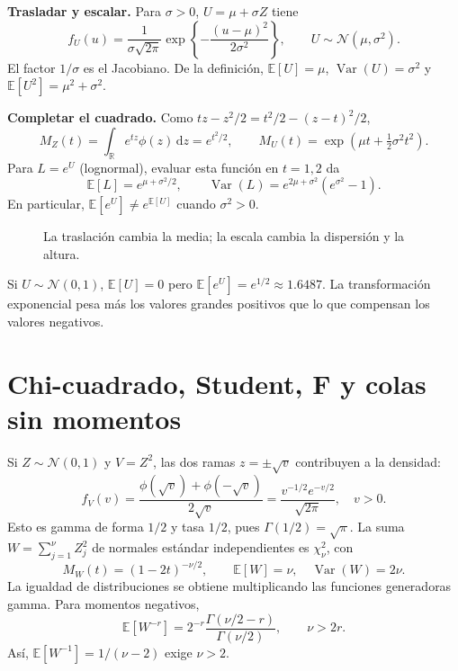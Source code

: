 \documentclass[11pt,a4paper]{article}
\newcommand{\R}{\mathbb R}
\newcommand{\E}{\mathbb E}
\newcommand{\dd}{\,\mathrm d}
\DeclareMathOperator{\Var}{Var}
\newcommand{\Normal}{\mathcal N}
\newcommand{\topic}[2]{\clearpage\section{#1}\label{#2}}
\theoremstyle{definition}\newtheorem{definicion}[teorema]{Definición}
\begin{document}
\textbf{Trasladar y escalar.} Para $\sigma>0$, $U=\mu+\sigma Z$ tiene
\[
f_U(u)=\frac1{\sigma\sqrt{2\pi}}
\exp\!\left\{-\frac{(u-\mu)^2}{2\sigma^2}\right\},
\qquad U\sim\Normal(\mu,\sigma^2).
\]
El factor $1/\sigma$ es el Jacobiano. De la definición,
$\E[U]=\mu$, $\Var(U)=\sigma^2$ y $\E[U^2]=\mu^2+\sigma^2$.

\textbf{Completar el cuadrado.} Como $tz-z^2/2=t^2/2-(z-t)^2/2$,
\[
M_Z(t)=\int_{\R}e^{tz}\phi(z)\dd z=e^{t^2/2},
\qquad
M_U(t)=\exp(\mu t+\tfrac12\sigma^2t^2).
\]
Para $L=e^U$ (lognormal), evaluar esta función en $t=1,2$ da
\[
\E[L]=e^{\mu+\sigma^2/2},\qquad
\Var(L)=e^{2\mu+\sigma^2}(e^{\sigma^2}-1).
\]
En particular, $\E[e^U]\ne e^{\E[U]}$ cuando $\sigma^2>0$.
\begin{figure}[H]\centering
{}
\caption{La traslación cambia la media; la escala cambia la dispersión y la altura.}
\end{figure}
\begin{ejemplo}
Si $U\sim\Normal(0,1)$, $\E[U]=0$ pero $\E[e^U]=e^{1/2}\approx1.6487$.
La transformación exponencial pesa más los valores grandes positivos que
lo que compensan los valores negativos.
\end{ejemplo}
\topic{Chi-cuadrado, Student, F y colas sin momentos}{s06}
Si $Z\sim\Normal(0,1)$ y $V=Z^2$, las dos ramas
$z=\pm\sqrt v$ contribuyen a la densidad:
\[
f_V(v)=\frac{\phi(\sqrt v)+\phi(-\sqrt v)}{2\sqrt v}
=\frac{v^{-1/2}e^{-v/2}}{\sqrt{2\pi}},\quad v>0.
\]
Esto es gamma de forma $1/2$ y tasa $1/2$, pues $\Gamma(1/2)=\sqrt\pi$.
La suma $W=\sum_{j=1}^{\nu}Z_j^2$ de normales estándar independientes
es $\chi^2_\nu$, con
\[
M_W(t)=(1-2t)^{-\nu/2},\qquad
\E[W]=\nu,\quad \Var(W)=2\nu.
\]
La igualdad de distribuciones se obtiene multiplicando las funciones
generadoras gamma. Para momentos negativos,
\[
\E[W^{-r}]
=2^{-r}\frac{\Gamma(\nu/2-r)}{\Gamma(\nu/2)},\qquad \nu>2r.
\]
Así, $\E[W^{-1}]=1/(\nu-2)$ exige $\nu>2$.
\end{document}
